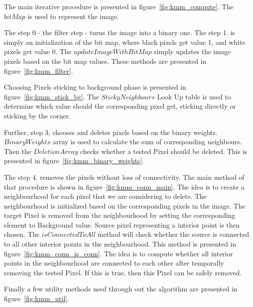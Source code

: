 \documentclass{article}
\begin{document}
The main iterative procedure is presented in figure~\ref{fig:kmm_compute}. The $bitMap$ is used to represent the image.

The step 0 - the filter step - turns the image into a binary one. The step 1. is simply an initialization of the bit map, where black pixels get value 1, and white pixels get value 0. The $updateImageWithBitMap$ simply updates the image pixels based on the bit map values. These methods are presented in figure~\ref{fig:kmm_filter}.

Choosing Pixels sticking to background phase is presented in figure~\ref{fig:kmm_stick_bg}. The $StickyNeighbours$ Look Up table is used to determine which value should the corresponding pixel get, sticking directly or sticking by the corner.

Further, step 3, chooses and deletes pixels based on the binary weights. $BinaryWeights$ array is used to calculate the sum of corresponding neighbours. Then the $Deletion Array$ checks whether a tested Pixel should be deleted. This is presented in figure~\ref{fig:kmm_binary_weights}.

The step 4. removes the pixels without loss of connectivity. The main method of that procedure is shown in figure~\ref{fig:kmm_conn_main}. The idea is to create a neighbourhood for each pixel that we are considering to delete. The neighbourhood is initialized based on the corresponding pixels in the image. The target Pixel is removed from the neighbourhood by setting the corresponding element to Background value. Source pixel representing a interior point is then chosen. The $isConnectedToAll$ method will check whether the source is connected to all other interior points in the neighbourhood. This method is presented in figure~\ref{fig:kmm_conn_is_conn}.
The idea is to compute whether all interior points in the neighbourhood are connected to each other after temporally removing the tested Pixel. If this is true, then this Pixel can be safely removed.

Finally a few utility methods used through out the algorithm are presented in figure~\ref{fig:kmm_util}.
\end{document}
